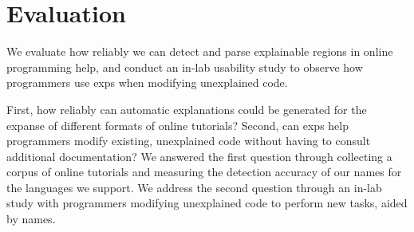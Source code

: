 \section{Evaluation}

\begin{changes}
We evaluate how reliably we can detect and parse explainable regions in online programming help, and conduct an in-lab usability study to observe how programmers use \glspl{exp} when modifying unexplained code.
\end{changes}
First, how reliably can automatic explanations could be generated for the expanse of different formats of online tutorials?
Second, can \glspl{exp} help programmers modify existing, unexplained code without having to consult additional documentation?
We answered the first question through collecting a corpus of online tutorials and measuring the detection accuracy of our \Glspl{name} for the languages we support.
We address the second question through an in-lab study with programmers modifying unexplained code to perform new tasks, aided by \Glspl{name}.
\fi
%
